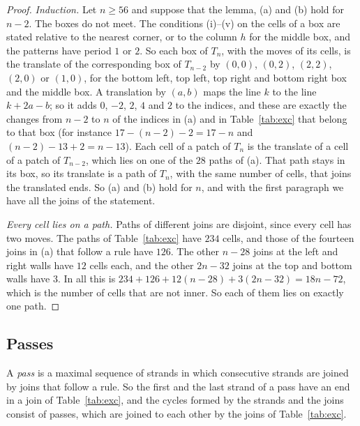 \documentclass[11pt]{amsart}
\theoremstyle{remark}
\begin{document}
\begin{proof}
\emph{Induction.} Let $n\ge56$ and suppose that the lemma, (a) and (b) hold for $n-2$. The boxes do not meet. The
conditions (i)--(v) on the cells of a box are stated relative to the nearest corner, or to the column $h$ for the middle
box, and the patterns have period $1$ or $2$. So each box of $T_n$, with the moves of its cells, is the translate of the
corresponding box of $T_{n-2}$ by $(0,0)$, $(0,2)$, $(2,2)$, $(2,0)$ or $(1,0)$, for the bottom left, top left, top right
and bottom right box and the middle box. A translation by $(a,b)$ maps the line $k$ to the line $k+2a-b$; so it adds $0$,
$-2$, $2$, $4$ and $2$ to the indices, and these are exactly the changes from $n-2$ to $n$ of the indices in (a) and in
Table~\ref{tab:exc} that belong to that box (for instance $17-(n-2)-2=17-n$ and $(n-2)-13+2=n-13$). Each cell of a patch of
$T_n$ is the translate of a cell of a patch of $T_{n-2}$, which lies on one of the $28$ paths of (a). That path stays in its
box, so its translate is a path of $T_n$, with the same number of cells, that joins the translated ends. So (a) and (b)
hold for $n$, and with the first paragraph we have all the joins of the statement.

\emph{Every cell lies on a path.} Paths of different joins are disjoint, since every cell has two moves. The paths of
Table~\ref{tab:exc} have $234$ cells, and those of the fourteen joins in (a) that follow a rule have $126$. The other
$n-28$ joins at the left and right walls have $12$ cells each, and the other $2n-32$ joins at the top and bottom walls
have $3$. In all this is $234+126+12(n-28)+3(2n-32)=18n-72$, which is the number of cells that are not inner. So each of
them lies on exactly one path.
\end{proof}

\subsection*{Passes}
A \emph{pass} is a maximal sequence of strands in which consecutive strands are joined by joins that follow a rule. So
the first and the last strand of a pass have an end in a join of Table~\ref{tab:exc}, and the cycles formed by the strands
and the joins consist of passes, which are joined to each other by the joins of Table~\ref{tab:exc}.
\end{document}
